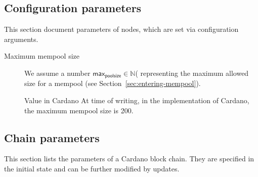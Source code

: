 \documentclass{article}
\newenvironment{currentvalue}{\begin{bclogo}[noborder=true,
    logo=\bcinfo, epBarre=3, couleurBarre=YellowOrange]{Value in Cardano}}{\end{bclogo}}
\newcommand{\maxmempoolsize}{\mathsf{max}_{\mathsf{poolsize}}}
\begin{document}
\subsection{Configuration parameters}
\label{sec:conf-param}

This section document parameters of nodes, which are set via
configuration arguments.

\begin{description}
\item[Maximum mempool size] We assume a number $\maxmempoolsize ∈ ℕ$(
  representing the maximum allowed size for a mempool (see
  Section~\ref{sec:entering-mempool}).
  \begin{currentvalue}
    At time of writing, in the implementation of Cardano, the maximum
    mempool size is 200.
  \end{currentvalue}
\end{description}

\subsection{Chain parameters}
\label{sec:chain-parameters}

This section lists the parameters of a Cardano block chain. They are
specified in the initial state and can be further modified by updates.
\end{document}
